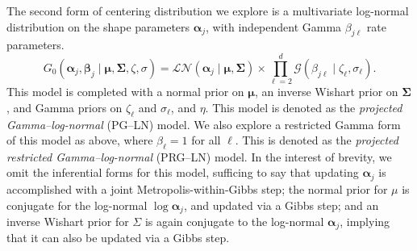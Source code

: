 The second form of centering distribution we explore is a multivariate log-normal distribution on the shape parameters $\bm{\alpha}_j$, with independent Gamma $\beta_{j\ell}$ rate parameters.  
\begin{equation}
    G_0\left(\bm{\alpha}_j,\bm{\beta}_j\mid\bm{\mu},\bm{\Sigma},\zeta,\sigma\right) = \mathcal{LN}\left(\bm{\alpha}_j\mid\bm{\mu},\bm{\Sigma}\right)\times\prod_{\ell = 2}^d\mathcal{G}\left(\beta_{j\ell}\mid\zeta_{\ell},\sigma_{\ell}\right).
\end{equation}
This model is completed with a normal prior on $\bm{\mu}$, an inverse Wishart prior on $\bm{\Sigma}$, and Gamma priors on $\zeta_{\ell}$ and $\sigma_{\ell}$, and $\eta$.  This model is denoted as the \emph{projected Gamma--log-normal} (PG--LN) model.  We also explore a restricted Gamma form of this model as above, where $\beta_{\ell} = 1$ for all $\ell$.  This is denoted as the \emph{projected restricted Gamma--log-normal} (PRG--LN) model.  In the interest of brevity, we omit the inferential forms for this model, sufficing to say that updating $\bm{\alpha}_j$ is accomplished with a joint Metropolis-within-Gibbs step; the normal prior for $\mu$ is conjugate for the log-normal $\log\bm{\alpha}_j$, and updated via a Gibbs step; and an inverse Wishart prior for $\Sigma$ is again conjugate to the log-normal $\bm{\alpha}_j$, implying that it can also be updated via a Gibbs step.


